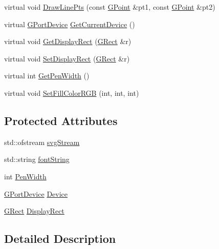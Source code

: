 \begin{DoxyCompactItemize}
\item 
virtual void \mbox{\hyperlink{class_g_base_port_ad176b1ff88c4c0a29d51869b13a288d2}{Draw\+Line\+Pts}} (const \mbox{\hyperlink{class_g_point}{G\+Point}} \&pt1, const \mbox{\hyperlink{class_g_point}{G\+Point}} \&pt2)
\item 
virtual \mbox{\hyperlink{gport_8h_a595e501a3b83fde14c760260fbfb153f}{G\+Port\+Device}} \mbox{\hyperlink{class_g_base_port_aeca5105700149693465fb5dbc43c9bbc}{Get\+Current\+Device}} ()
\item 
virtual void \mbox{\hyperlink{class_g_base_port_a2d6dd3aa5ad82b26ed614e139c2f6b8f}{Get\+Display\+Rect}} (\mbox{\hyperlink{class_g_rect}{G\+Rect}} \&r)
\item 
virtual void \mbox{\hyperlink{class_g_base_port_a8ac5424f05a6b6b982e570aae0802087}{Set\+Display\+Rect}} (\mbox{\hyperlink{class_g_rect}{G\+Rect}} \&r)
\item 
virtual int \mbox{\hyperlink{class_g_base_port_aeebcbb21b90ae5614d43b0111133932e}{Get\+Pen\+Width}} ()
\item 
virtual void \mbox{\hyperlink{class_g_base_port_af13ac2220d4ff90a160294c79d4a2c1b}{Set\+Fill\+Color\+R\+GB}} (int, int, int)
\end{DoxyCompactItemize}
\subsection*{Protected Attributes}
\begin{DoxyCompactItemize}
\item 
std\+::ofstream \mbox{\hyperlink{class_s_v_g_port_ad3e240ca528cd784e138dce907d5d45a}{svg\+Stream}}
\item 
std\+::string \mbox{\hyperlink{class_s_v_g_port_a84d591ffe687b48a18ef8dbfebe9bce4}{font\+String}}
\item 
int \mbox{\hyperlink{class_g_base_port_a9a76c3a8af8d0e9f29035d02d8f038c1}{Pen\+Width}}
\item 
\mbox{\hyperlink{gport_8h_a595e501a3b83fde14c760260fbfb153f}{G\+Port\+Device}} \mbox{\hyperlink{class_g_base_port_a14275a027c8665d5fa4941e148a1b46a}{Device}}
\item 
\mbox{\hyperlink{class_g_rect}{G\+Rect}} \mbox{\hyperlink{class_g_base_port_ac0e1180ebadeed5d3c7d0291db1bdf29}{Display\+Rect}}
\end{DoxyCompactItemize}


\subsection{Detailed Description}


